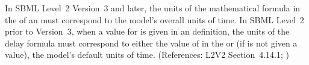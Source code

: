 In SBML Level~2 Version~3 and later, the units of the mathematical
formula in the \Delay of an \Event must correspond to the model's
overall units of time.  In SBML Level~2 prior to Version~3, when a
value for  is given in an \Event definition, the
units of the delay formula must correspond to either the value of
 in the \Event or (if  is not
given a value), the model's default units of time.  (References:
L2V2 Section~4.14.1; )
